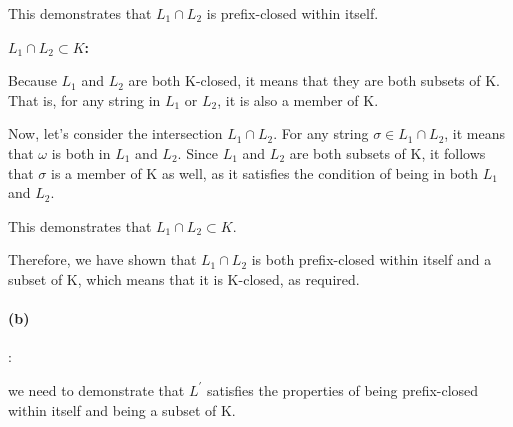 \documentclass{article}
\begin{document}
This demonstrates that $L_1 \cap L_2$ is prefix-closed within itself.

\textbf{$L_1 \cap L_2 \subset K$:}

Because $L_1$ and $L_2$ are both K-closed, it means that they are both subsets of K. That is, for any string in $L_1$ or $L_2$, it is also a member of K.

Now, let's consider the intersection $L_1 \cap L_2$. For any string $\sigma \in L_1 \cap L_2$, it means that $\omega$ is both in $L_1$ and $L_2$. Since $L_1$ and $L_2$ are both subsets of K, it follows that $\sigma$ is a member of K as well, as it satisfies the condition of being in both $L_1$ and $L_2$.

This demonstrates that $L_1 \cap L_2 \subset K$.

Therefore, we have shown that $L_1 \cap L_2$ is both prefix-closed within itself and a subset of K, which means that it is K-closed, as required.

\paragraph{(b)}:

we need to demonstrate that $L^\prime$ satisfies the properties of being prefix-closed within itself and being a subset of K.
\end{document}
